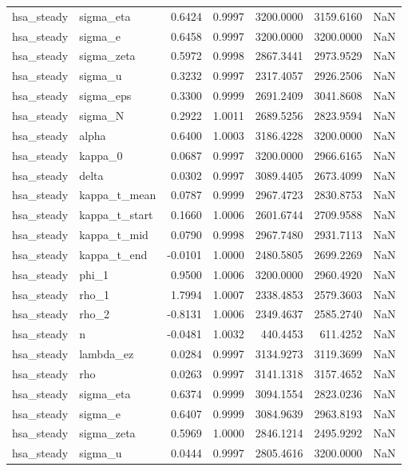\begin{tabular}{llrrrrl}
hsa\_steady & sigma\_eta & 0.6424 & 0.9997 & 3200.0000 & 3159.6160 & NaN \\
hsa\_steady & sigma\_e & 0.6458 & 0.9997 & 3200.0000 & 3200.0000 & NaN \\
hsa\_steady & sigma\_zeta & 0.5972 & 0.9998 & 2867.3441 & 2973.9529 & NaN \\
hsa\_steady & sigma\_u & 0.3232 & 0.9997 & 2317.4057 & 2926.2506 & NaN \\
hsa\_steady & sigma\_eps & 0.3300 & 0.9999 & 2691.2409 & 3041.8608 & NaN \\
hsa\_steady & sigma\_N & 0.2922 & 1.0011 & 2689.5256 & 2823.9594 & NaN \\
hsa\_steady & alpha & 0.6400 & 1.0003 & 3186.4228 & 3200.0000 & NaN \\
hsa\_steady & kappa\_0 & 0.0687 & 0.9997 & 3200.0000 & 2966.6165 & NaN \\
hsa\_steady & delta & 0.0302 & 0.9997 & 3089.4405 & 2673.4099 & NaN \\
hsa\_steady & kappa\_t\_mean & 0.0787 & 0.9999 & 2967.4723 & 2830.8753 & NaN \\
hsa\_steady & kappa\_t\_start & 0.1660 & 1.0006 & 2601.6744 & 2709.9588 & NaN \\
hsa\_steady & kappa\_t\_mid & 0.0790 & 0.9998 & 2967.7480 & 2931.7113 & NaN \\
hsa\_steady & kappa\_t\_end & -0.0101 & 1.0000 & 2480.5805 & 2699.2269 & NaN \\
hsa\_steady & phi\_1 & 0.9500 & 1.0006 & 3200.0000 & 2960.4920 & NaN \\
hsa\_steady & rho\_1 & 1.7994 & 1.0007 & 2338.4853 & 2579.3603 & NaN \\
hsa\_steady & rho\_2 & -0.8131 & 1.0006 & 2349.4637 & 2585.2740 & NaN \\
hsa\_steady & n & -0.0481 & 1.0032 & 440.4453 & 611.4252 & NaN \\
hsa\_steady & lambda\_ez & 0.0284 & 0.9997 & 3134.9273 & 3119.3699 & NaN \\
hsa\_steady & rho & 0.0263 & 0.9997 & 3141.1318 & 3157.4652 & NaN \\
hsa\_steady & sigma\_eta & 0.6374 & 0.9999 & 3094.1554 & 2823.0236 & NaN \\
hsa\_steady & sigma\_e & 0.6407 & 0.9999 & 3084.9639 & 2963.8193 & NaN \\
hsa\_steady & sigma\_zeta & 0.5969 & 1.0000 & 2846.1214 & 2495.9292 & NaN \\
hsa\_steady & sigma\_u & 0.0444 & 0.9997 & 2805.4616 & 3200.0000 & NaN \\

\end{tabular}
